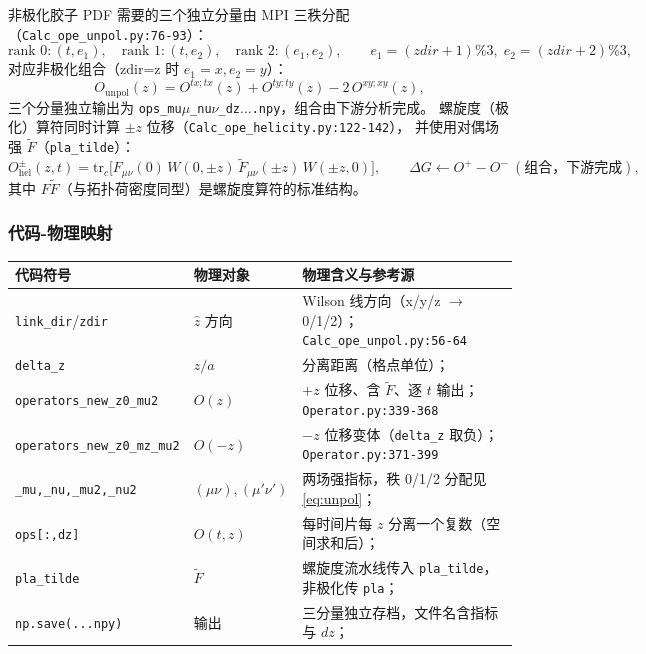 \documentclass[UTF8]{ctexart}
\begin{document}
非极化胶子 PDF 需要的三个独立分量由 MPI 三秩分配
（\texttt{\nolinkurl{Calc\_ope\_unpol.py:76-93}}）：
\begin{equation}\label{eq:unpol}
\text{rank 0}:(t,e_1),\quad
\text{rank 1}:(t,e_2),\quad
\text{rank 2}:(e_1,e_2),\qquad
e_1=(zdir+1)\%3,\; e_2=(zdir+2)\%3,
\end{equation}
对应非极化组合（zdir=z 时 $e_1=x,e_2=y$）：
\begin{equation}\label{eq:unpolcomb}
O_{\mathrm{unpol}}(z)=O^{tx;tx}(z)+O^{ty;ty}(z)-2\,O^{xy;xy}(z),
\end{equation}
三个分量独立输出为 \texttt{ops\_mu$\mu$\_nu$\nu$\_dz$\ldots$.npy}，组合由下游分析完成。
螺旋度（极化）算符同时计算 $\pm z$ 位移（\texttt{\nolinkurl{Calc\_ope\_helicity.py:122-142}}），
并使用对偶场强 $\widetilde F$（\texttt{pla\_tilde}）：
\begin{equation}\label{eq:hel}
O^{\pm}_{\mathrm{hel}}(z,t)=\mathrm{tr}_c\big[F_{\mu\nu}(0)\,W(0,\pm z)\,\widetilde F_{\mu\nu}(\pm z)\,W(\pm z,0)\big],
\qquad
\Delta G \leftarrow O^{+}-O^{-}\ (\text{组合，下游完成}),
\end{equation}
其中 $F\widetilde F$（与拓扑荷密度同型）是螺旋度算符的标准结构。

\subsubsection{代码-物理映射}
\begin{xltabular}{\textwidth}{llX}
\toprule
\textcolor{map}{代码符号} & 物理对象 & 物理含义与参考源 \\
\midrule
\endhead
\texttt{link\_dir}/\texttt{zdir} & $\hat z$ 方向 & Wilson 线方向（x/y/z $\to$ 0/1/2）；\texttt{\nolinkurl{Calc_ope_unpol.py:56-64}} \\
\texttt{delta\_z} & $z/a$ & 分离距离（格点单位）；\\
\texttt{operators\_new\_z0\_mu2} & $O(z)$ & $+z$ 位移、含 $\widetilde F$、逐 $t$ 输出；\texttt{\nolinkurl{Operator.py:339-368}} \\
\texttt{operators\_new\_z0\_mz\_mu2} & $O(-z)$ & $-z$ 位移变体（\texttt{delta\_z} 取负）；\texttt{\nolinkurl{Operator.py:371-399}} \\
\texttt{\_mu,\_nu,\_mu2,\_nu2} & $(\mu\nu),(\mu'\nu')$ & 两场强指标，秩 0/1/2 分配见 \eqref{eq:unpol}；\\
\texttt{ops[:,dz]} & $O(t,z)$ & 每时间片每 $z$ 分离一个复数（空间求和后）；\\
\texttt{pla\_tilde} & $\widetilde F$ & 螺旋度流水线传入 \texttt{pla\_tilde}，非极化传 \texttt{pla}；\\
\texttt{np.save(...npy)} & 输出 & 三分量独立存档，文件名含指标与 $dz$；\\
\bottomrule
\end{xltabular}
\end{document}
